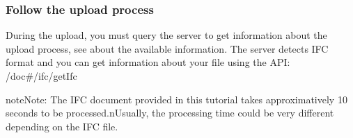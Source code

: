 \documentclass[a4paper,12pt,english]{sphinxmanual}
\begin{document}
\subsubsection{Follow the upload process}
\label{\detokenize{tutorials/retrieve-elements:follow-the-upload-process}}
During the upload, you must query the server to get information about the upload process, see  about the available information.
The server detects IFC format and you can get information about your file using the API: /doc\#/ifc/getIfc

\begin{sphinxadmonition}{note}{Note:}
The IFC document provided in this tutorial takes approximatively 10 seconds to be processed.nUsually, the processing time could be very different depending on the IFC file.
\end{sphinxadmonition}

%
\begin{sphinxVerbatim}[commandchars=\\\{\}]
 
 

  

  
      
       
       

      

      
          
\end{sphinxVerbatim}
\end{document}
